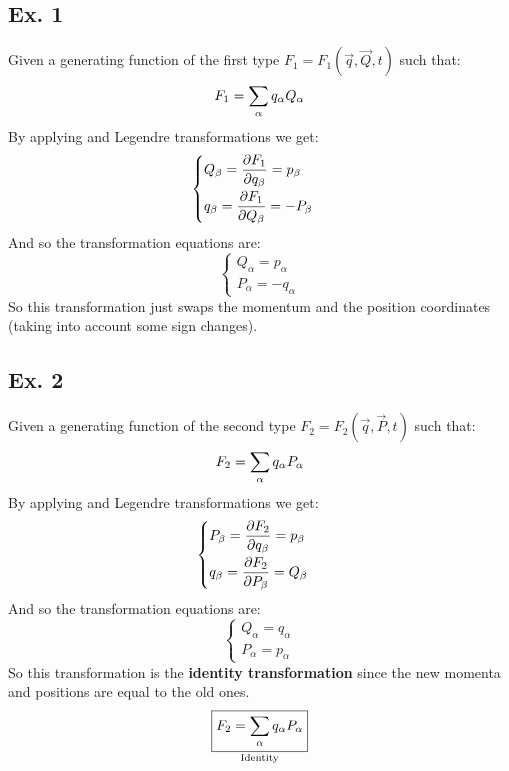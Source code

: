 \subsection{Ex. 1}
Given a generating function of the first type $F_1 = F_1(\vec{q},\vec{Q},t)$ such that:
\begin{equation}
    F_1 = \displaystyle\sum_{\alpha} q_{\alpha}Q_{\alpha}
\end{equation}
By applying \hamiltonref\;and Legendre transformations we get:
\begin{equation}
    \begin{cases}
        Q_{\beta} = \pdv{F_1}{q_{\beta}} = p_{\beta}\\[8pt]
        q_{\beta} = \pdv{F_1}{Q_{\beta}} = -P_{\beta}
    \end{cases}
\end{equation}
And so the transformation equations are:
\begin{equation}
    \begin{cases}
        Q_{\alpha} = p_{\alpha}\\[8pt]
        P_{\alpha} = -q_{\alpha}
    \end{cases}
\end{equation}
So this transformation just swaps the momentum and the position coordinates (taking into account some sign changes).
\subsection{Ex. 2}
Given a generating function of the second type $F_2 = F_2(\vec{q},\vec{P},t)$ such that:
\begin{equation}
    F_2 = \displaystyle\sum_{\alpha} q_{\alpha}P_{\alpha}
\end{equation}
By applying \hamiltonref\;and Legendre transformations we get:
\begin{equation}
    \begin{cases}
        P_{\beta} = \pdv{F_2}{q_{\beta}} = p_{\beta}\\[8pt]
        q_{\beta} = \pdv{F_2}{P_{\beta}} = Q_{\beta}
    \end{cases}
\end{equation}
And so the transformation equations are:
\begin{equation}
    \begin{cases}
        Q_{\alpha} = q_{\alpha}\\[8pt]
        P_{\alpha} = p_{\alpha}
    \end{cases}
\end{equation}
So this transformation is the \textbf{identity transformation} since the new momenta and positions are equal to the old ones.
\begin{equation}
    \underset{\text{Identity}}{\boxed{F_2 = \displaystyle\sum_{\alpha} q_{\alpha}P_{\alpha}}}
\end{equation}
